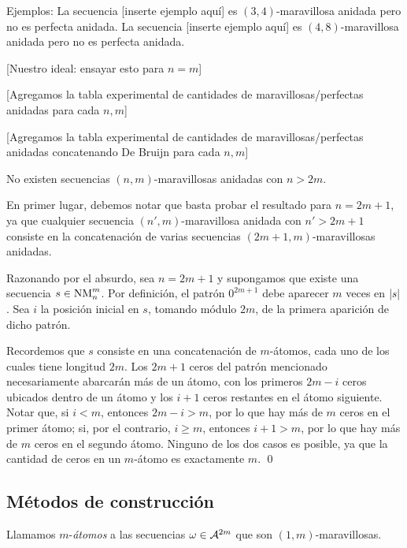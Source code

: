 \documentclass[11pt]{article}
\begin{document}
Ejemplos: La secuencia [inserte ejemplo aquí] es $(3, 4)$-maravillosa anidada pero no es perfecta anidada.
La secuencia [inserte ejemplo aquí] es $(4, 8)$-maravillosa anidada pero no es perfecta anidada.

	[Nuestro ideal: ensayar esto para $n = m$]

	[Agregamos la tabla experimental de cantidades de maravillosas/perfectas anidadas para cada $n, m$]

	[Agregamos la tabla experimental de cantidades de maravillosas/perfectas anidadas concatenando De Bruijn para cada $n, m$]

\begin{prop}
	No existen secuencias $(n,m)$-maravillosas anidadas con $n > 2m$.
\end{prop}

\begin{demo}
	En primer lugar, debemos notar que basta probar el resultado para $n = 2m +
		1$, ya que cualquier secuencia $(n',m)$-maravillosa anidada con $n' > 2m +
		1$ consiste en la concatenación de varias secuencias
	$(2m+1,m)$-maravillosas anidadas.

	Razonando por el absurdo, sea $n = 2m + 1$ y supongamos que existe una
	secuencia $s \in \text{NM}_{n}^{m}$. Por definición, el patrón $0^{2m+1}$ debe
	aparecer $m$ veces en $\left\vert s\right\vert$. Sea $i$ la posición inicial en $s$, tomando
	módulo $2m$, de la primera aparición de dicho patrón.

	Recordemos que $s$ consiste en una concatenación de $m$-átomos, cada uno de
	los cuales tiene longitud $2m$. Los $2m+1$ ceros del patrón mencionado
	necesariamente abarcarán más de un átomo, con los primeros $2m - i$ ceros
	ubicados dentro de un átomo y los $i + 1$ ceros restantes en el átomo
	siguiente. Notar que, si $i < m$, entonces $2m - i > m$, por lo que hay más
	de $m$ ceros en el primer átomo; si, por el contrario, $i \geq m$, entonces
	$i + 1 > m$, por lo que hay más de $m$ ceros en el segundo átomo. Ninguno
	de los dos casos es posible, ya que la cantidad de ceros en un $m$-átomo es
	exactamente $m$. \qed
\end{demo}

\subsection{Métodos de construcción}

\begin{defi}
	Llamamos $m$-\emph{átomos} a las secuencias $\omega \in \mathcal{A}^{2m}$ que
	son $(1,m)$-maravillosas.
\end{defi}
\end{document}
